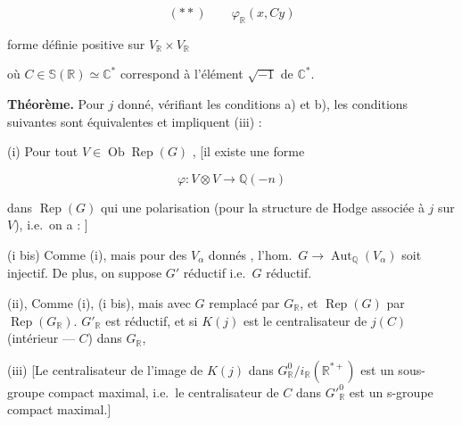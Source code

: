 \documentclass[11pt,a4paper]{article}
\begin{document}
\[ (**) \qquad \varphi_{\mathbb{R}}(x, Cy) \]

forme  définie positive sur $V_{\mathbb{R}} \times V_{\mathbb{R}}$



où $C \in \mathbb{S}(\mathbb{R}) \simeq \mathbb{C}^{*}$ correspond à l'élément
$\sqrt{-1}$ de $\mathbb{C}^{*}$.



\textbf{Théorème.} Pour $j$ donné, vérifiant les conditions a) et b), les
conditions suivantes \ill{} sont équivalentes et impliquent (iii) :

(i) Pour tout $V \in \operatorname{Ob} \operatorname{Rep}(G)$ , [il existe une forme

\[ \varphi : V \otimes V \longrightarrow \mathbb{Q}(-n) \]

dans $\operatorname{Rep}(G)$ qui  une polarisation (pour la
structure de Hodge associée à $j$ sur $V$), i.e.\ on a :
]

(i bis) Comme (i), mais  pour des $V_{\alpha}$ donnés
\add{\ill{}} , \struck{\ill{}}  l'hom.\
$G \to \operatorname{Aut}_{\mathbb{Q}}(V_{\alpha})$ soit injectif. De plus, on
suppose $G'$ réductif i.e.\ $G$ réductif.

(ii),  \struck{\ill{}} Comme (i), (i bis), mais avec $G$
remplacé par $G_{\mathbb{R}}$, et $\operatorname{Rep}(G)$ par
$\operatorname{Rep}(G_{\mathbb{R}})$. $G'_{\mathbb{R}}$ est réductif, et si
$K(j)$ est \struck{\ill{}} le centralisateur de $j(C)$ (intérieur --- $C$) dans
$G_{\mathbb{R}}$,

(iii) [Le \struck{\ill{}} centralisateur de l'image de $K(j)$ dans
$G^{0}_{\mathbb{R}} / i_{\mathbb{R}}(\mathbb{R}^{*+})$ est un sous-groupe
compact maximal, i.e.\ le centralisateur de $C$ dans ${G'}^{0}_{\mathbb{R}}$ est
un s-groupe compact \struck{\ill{}} maximal.]
\end{document}
